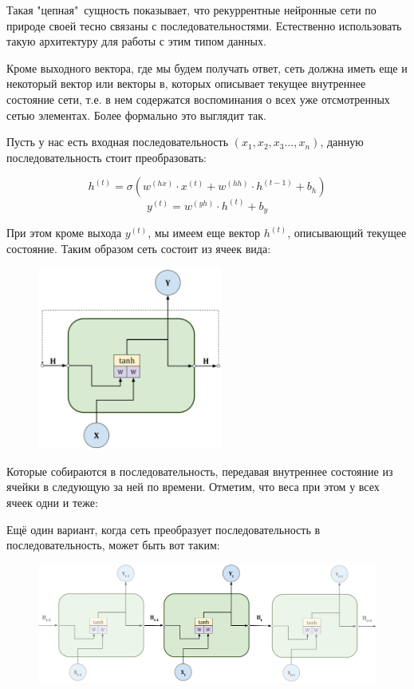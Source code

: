 \documentclass[a4paper,russian]{article}
\begin{document}
	Такая "цепная"\ сущность показывает, что рекуррентные нейронные сети по природе своей тесно связаны с последовательностями. Естественно использовать такую архитектуру для работы с этим типом данных.
	
	Кроме выходного вектора, где мы будем получать ответ, сеть должна иметь еще и некоторый вектор или векторы в, которых описывает текущее внутреннее состояние сети, т.е. в нем содержатся воспоминания о всех уже отсмотренных сетью элементах. Более формально это выглядит так.
	
	Пусть у нас есть входная последовательность $(x_{1}, x_{2}, x_{3} ..., x_{n})$, данную последовательность стоит преобразовать:
	
	$$	h^{(t)} = \sigma(w^{(hx)} \cdot x^{(t)} + w^{(hh)} \cdot h^{(t - 1)} + b_h) $$
	$$	y^{(t)} = w^{(yh)} \cdot h^{(t)} + b_y $$
	
	При этом кроме выхода $y^(t)$, мы имеем еще вектор $h^{(t)}$, описывающий текущее состояние. Таким образом сеть состоит из ячеек вида:
	
	\begin{figure}[ht!]
		\centering
		\captionsetup{justification=centering}
		\includegraphics[height=60mm]{img/rnn_with_recurrent_link.png}
	\end{figure}
	
	Которые собираются в последовательность, передавая внутреннее состояние из ячейки в следующую за ней по времени. Отметим, что веса при этом у всех ячеек одни и теже:

	Ещё один вариант, когда сеть преобразует последовательность в последовательность, может быть вот таким:
	
	\begin{figure}[ht!]
		\centering
		\captionsetup{justification=centering}
		\includegraphics[width=120mm]{img/rnn_unfolded.png}
	\end{figure}
\end{document}
